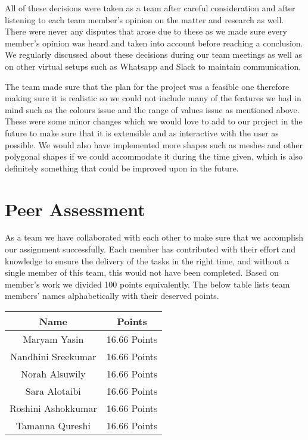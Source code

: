\documentclass{article}
\begin{document}
\begin{enumerate}
All of these decisions were taken as a team after careful consideration and after listening to each team member’s opinion on the matter and research as well. There were never any disputes that arose due to these as we made sure every member’s opinion was heard and taken into account before reaching a conclusion. We regularly discussed about these decisions during our team meetings as well as on other virtual setups such as Whatsapp and Slack to maintain communication. 

The team made sure that the plan for the project was a feasible one therefore making sure it is realistic so we could not include many of the features we had in mind such as the colours issue and the range of values issue as mentioned above. These were some minor changes which we would love to add to our project in the future to make sure that it is extensible and as interactive with the user as possible. We would also have implemented more shapes such as meshes and other polygonal shapes if we could accommodate it during the time given, which is also definitely something that could be improved upon in the future.

\end{enumerate}
\newpage

\section{Peer Assessment}
As a team we have collaborated with each other to make sure that we accomplish our assignment successfully.  Each member has contributed with their effort and knowledge to ensure the delivery of the tasks in the right time, and without a single member of this team, this would not have been completed. Based on member’s work we divided 100 points equivalently. The below table lists team members' names alphabetically with their deserved points.  

\begin{center}
\begin{tabular}{ |c|c|} 
\hline
\textbf{Name} & \textbf{Points }  \\ 
\hline
Maryam Yasin  & 16.66 Points    \\ 
\hline
Nandhini Sreekumar  &  16.66 Points   \\ 
\hline

Norah Alsuwily  & 16.66 Points  
 \\ 
\hline
Sara Alotaibi & 16.66 Points  \\ 
\hline
Roshini Ashokkumar  &  16.66 Points \\ 
\hline
Tamanna Qureshi  & 16.66 Points  \\ 
\hline

\end{tabular}
\end{center}
\end{document}
